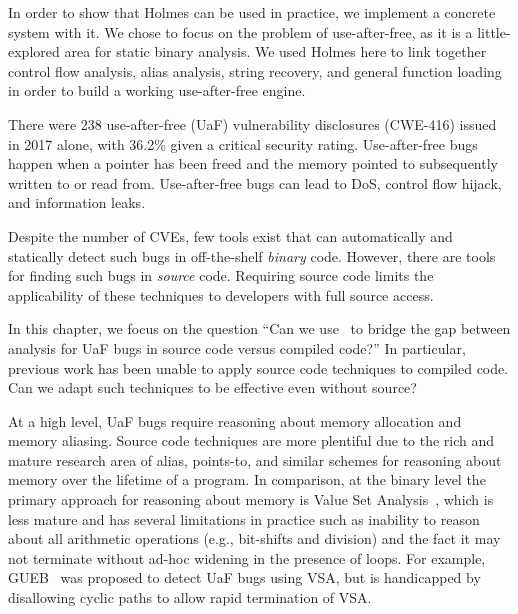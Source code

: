 In order to show that Holmes can be used in practice, we implement a concrete system with it.
We chose to focus on the problem of use-after-free, as it is a little-explored area for static binary analysis.
We used Holmes here to link together control flow analysis, alias analysis, string recovery, and general function loading in order to build a working use-after-free engine.

There were 238 use-after-free (UaF) vulnerability disclosures (CWE-416) issued in 2017 alone, with 36.2\% given a critical security
rating.
Use-after-free bugs happen when a pointer has been freed and the memory pointed to subsequently written to or read from.
Use-after-free bugs can lead to DoS, control flow hijack, and information leaks.

Despite the number of CVEs, few tools exist that can automatically and statically detect such bugs in off-the-shelf \emph{binary} code.
However, there are tools for finding such bugs in \emph{source} code.
Requiring source code limits the applicability of these techniques to developers with full source access.

In this chapter, we focus on the question
``Can we use \sysname\ to bridge the gap between analysis for UaF bugs in source code versus compiled code?''
In particular, previous work has been unable to apply source code techniques to compiled code.
Can we adapt such techniques to be effective even without source?

At a high level, UaF bugs require reasoning about memory allocation and memory aliasing.
Source code techniques are more plentiful due to the rich and mature research area of alias, points-to, and similar schemes for reasoning about memory over the lifetime of a program.
In comparison, at the binary level the primary approach for reasoning about memory is Value Set Analysis~\cite{vsa}, which is less mature and has several limitations in practice such as inability to reason about all arithmetic operations (e.g., bit-shifts and division) and the fact it may not terminate without ad-hoc widening in the presence of loops.
For example, GUEB~\cite{gueb} was proposed to detect UaF bugs using VSA, but is handicapped by disallowing cyclic paths to allow rapid termination of VSA.


